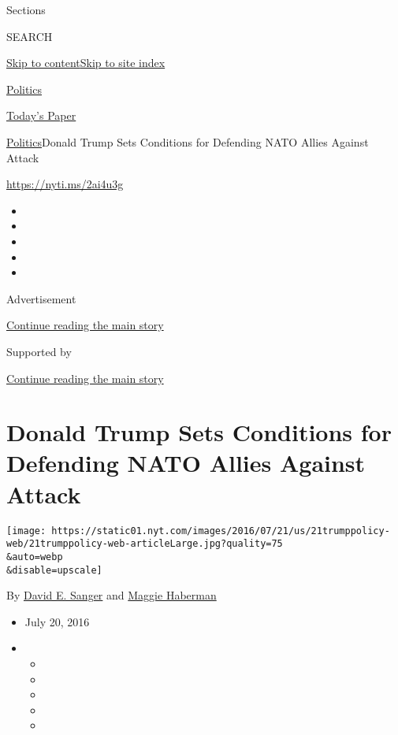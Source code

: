 Sections

SEARCH

\protect\hyperlink{site-content}{Skip to
content}\protect\hyperlink{site-index}{Skip to site index}

\href{https://www.nytimes.com/section/politics}{Politics}

\href{https://myaccount.nytimes.com/auth/login?response_type=cookie\&client_id=vi}{}

\href{https://www.nytimes.com/section/todayspaper}{Today's Paper}

\href{/section/politics}{Politics}\textbar{}Donald Trump Sets Conditions
for Defending NATO Allies Against Attack

\url{https://nyti.ms/2ai4u3g}

\begin{itemize}
\item
\item
\item
\item
\item
\end{itemize}

Advertisement

\protect\hyperlink{after-top}{Continue reading the main story}

Supported by

\protect\hyperlink{after-sponsor}{Continue reading the main story}

\hypertarget{donald-trump-sets-conditions-for-defending-nato-allies-against-attack}{%
\section{Donald Trump Sets Conditions for Defending NATO Allies Against
Attack}\label{donald-trump-sets-conditions-for-defending-nato-allies-against-attack}}

\texttt{[image: https://static01.nyt.com/images/2016/07/21/us/21trumppolicy-web/21trumppolicy-web-articleLarge.jpg?quality=75\\\&auto=webp\\\&disable=upscale]}

By \href{http://www.nytimes.com/by/david-e-sanger}{David E. Sanger} and
\href{http://www.nytimes.com/by/maggie-haberman}{Maggie Haberman}

\begin{itemize}
\item
  July 20, 2016
\item
  \begin{itemize}
  \item
  \item
  \item
  \item
  \item
  \end{itemize}
\end{itemize}

